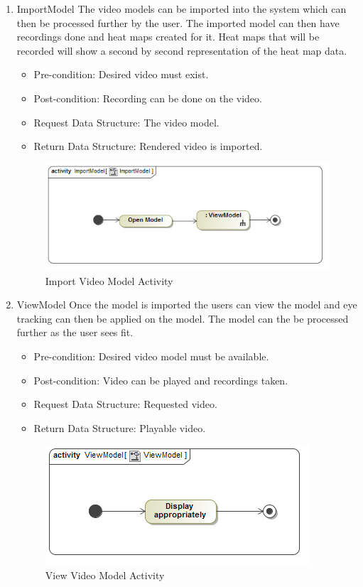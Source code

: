 		\begin{enumerate}
			\item{ImportModel}
			\newline
			The video models can be imported into the system which can then be processed further by the user. The imported model can then have recordings done and heat maps created for it. Heat maps that will be recorded will show a second by second representation of the heat map data.
			\begin{itemize}
				\item Pre-condition: Desired video must exist.
				\item Post-condition: Recording can be done on the video.
				\item Request Data Structure: The video model.
				\item Return Data Structure: Rendered video is imported.
			\end{itemize}
			
			\begin{figure}[!ht]
				\centering
				\includegraphics[scale=0.5]{Diagrams/Activity_Diagram__ImportModel__ImportModel.png}
				\caption{Import Video Model Activity}
			\end{figure}
			
			\item{ViewModel}
Once the model is imported the users can view the model and eye tracking can then be applied on the 	model. The model can the be processed further as the user sees fit.
			\begin{itemize}
				\item Pre-condition: Desired video model must be available.
				\item Post-condition: Video can be played and recordings taken.
				\item Request Data Structure: Requested video.
				\item Return Data Structure: Playable video.
			\end{itemize}
			\begin{figure}
				\centering
				\includegraphics[scale=0.5]{Diagrams/Activity_Diagram__ViewModel__ViewModel.png}
				\caption{View Video Model Activity}
			\end{figure}
			

\end{enumerate}
